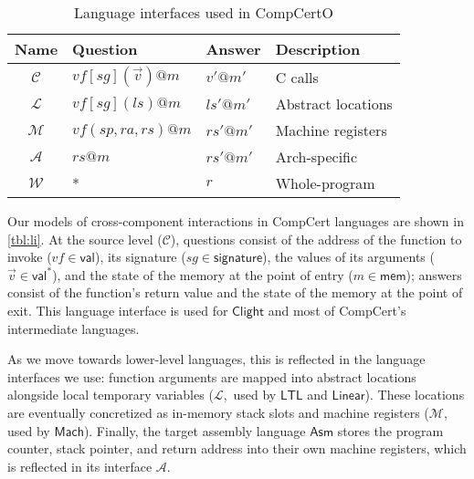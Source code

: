 \documentclass[sigplan,screen,review]{acmart}
\newcommand{\figsize}{\small}
\newcommand{\kw}[1]{\ensuremath{ \mathsf{#1} }}
\begin{document}
\begin{table} %
  \caption{Language interfaces used in CompCertO}
  \label{tbl:li}
  \setlength\tabcolsep{4pt}
  \begin{tabular}{clll}
    \toprule
    Name & Question & Answer & Description \\
    \midrule
    $\mathcal{C}$ &
      $\mathit{vf}[\mathit{sg}](\vec{v})@m$ & $v'@m'$ &
      C calls \\
    $\mathcal{L}$ &
      $\mathit{vf}[\mathit{sg}](\mathit{ls})@m$ & $\mathit{ls}'@m'$ &
      Abstract locations \\
    $\mathcal{M}$ &
      $\mathit{vf}(\mathit{sp},\mathit{ra},\mathit{rs})@m$ & $\mathit{rs}'@m'$ &
      Machine registers \\
    $\mathcal{A}$ &
      $\mathit{rs}@m$ & $\mathit{rs}'@m'$ &
      Arch-specific \\
    $\mathcal{W}$ & * & $r$ &
      Whole-program \\
    \bottomrule
  \end{tabular}
\end{table}

Our models of cross-component interactions in CompCert languages
are shown in \autoref{tbl:li}.
At the source level ($\mathcal{C}$),
questions consist of
the address of the function to invoke
($\mathit{vf} \in \kw{val}$),
its signature
($\mathit{sg} \in \kw{signature}$),
the values of its arguments
($\vec{v} \in \kw{val}^*$),
and the state of the memory at the point of entry
($m \in \kw{mem}$);
answers
consist of the function's return value
and the state of the memory at the point of exit.
This language interface is used for \kw{Clight} and
most of CompCert's intermediate languages.

As we move towards lower-level languages,
this is reflected in the language interfaces we use:
function arguments are mapped into
abstract locations alongside local temporary variables
($\mathcal{L}$,~used by \kw{LTL} and \kw{Linear}).
These locations are eventually concretized as
in-memory stack slots and machine registers
($\mathcal{M}$, used by \kw{Mach}).
Finally, the target assembly language \kw{Asm}
stores the program counter, stack pointer,
and return address into their own machine registers,
which is reflected in its interface $\mathcal{A}$.
\end{document}
